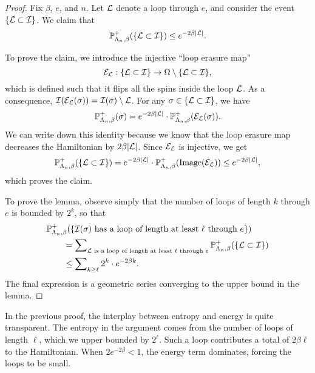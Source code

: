 \begin{proof}
    Fix $\beta$, $e$, and $n$.
    Let $\mathcal L$ denote a loop through $e$,
    and consider the event $\{\mathcal L\subset\mathcal I\}$.
    We claim that
    \[
        \mathbb P_{\Lambda_n,\beta}^+
        (\{\mathcal L\subset\mathcal I\})
        \leq e^{-2\beta|\mathcal L|}.
    \]

    To prove the claim,
    we introduce the injective ``loop erasure map''
    \[
        \mathcal E_\mathcal L:\{\mathcal L\subset\mathcal I\}
        \to \Omega\setminus \{\mathcal L\subset\mathcal I\},
    \]
    which is defined such that it flips all the spins inside the loop $\mathcal L$.
    As a consequence, $\mathcal I(\mathcal E_\mathcal L(\sigma))=\mathcal I(\sigma)\setminus\mathcal L$.
    For any $\sigma\in\{\mathcal L\subset\mathcal I\}$, we have
    \[
        \mathbb P_{\Lambda_n,\beta}^+
        (\sigma)
        =
        e^{-2\beta|\mathcal L|}
        \cdot
        \mathbb P_{\Lambda_n,\beta}^+
        (\mathcal E_\mathcal L(\sigma))
        .
    \]
    We can write down this identity because we know that the loop erasure map
    decreases the Hamiltonian by $2\beta|\mathcal L|$.
    Since $\mathcal E_\mathcal L$ is injective, we get
    \[
        \mathbb P_{\Lambda_n,\beta}^+
        (\{\mathcal L\subset\mathcal I\})
        = e^{-2\beta|\mathcal L|}\cdot \mathbb P_{\Lambda_n,\beta}^+(\operatorname{Image}(\mathcal E_\mathcal L))
        \leq e^{-2\beta|\mathcal L|},
    \]
    which proves the claim.

    To prove the lemma, observe simply that the number of loops of length $k$
    through $e$ is bounded by $2^k$, so that 
    \begin{align}
        &\P_{\Lambda_n,\beta}^+
        (\{\text{$\calI(\sigma)$ has a loop of length at least $\ell$ through $e$}\})
        \\&\qquad=
        \sum\nolimits_{\text{$\calL$ is a loop of length at least $\ell$ through $e$}}
        \P_{\Lambda_n,\beta}^+
        (\{\calL\subset\calI\})
        \\&\qquad\leq 
        \sum\nolimits_{k\geq \ell} 2^k\cdot e^{-2\beta k}.
    \end{align}
    The final expression is a geometric series converging to the upper bound
    in the lemma.
\end{proof}

\begin{remark}
    In the previous proof,
    the interplay between entropy and energy is quite transparent.
    The entropy in the argument comes from the number of loops of length
    $\ell$, which we upper bounded by $2^\ell$.
    Such a loop contributes a total of $2\beta\ell$ to the Hamiltonian.
    When $2e^{-2\beta}<1$, the energy term dominates,
    forcing the loops to be small.
\end{remark}

